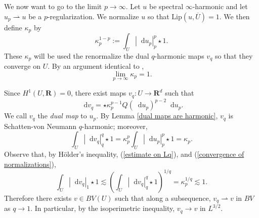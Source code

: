 \documentclass[reqno,11pt]{amsart}
\newcommand{\RR}{\mathbf{R}}
\newcommand*\dif{\mathop{}\!\mathrm{d}}
\newcommand{\Lip}{\mathrm{Lip}}
\newcommand{\dfn}[1]{\emph{#1}\index{#1}}
\newcommand{\weakto}{\rightharpoonup}
\theoremstyle{definition}
\numberwithin{equation}{section}
\begin{document}
We now want to go to the limit $p \to \infty$.
Let $u$ be spectral $\infty$-harmonic and let $u_p \weakto u$ be a $p$-regularization.
We normalize $u$ so that $\Lip(u, \overline U) = 1$.
We then define $\kappa_p$ by 
\begin{equation}\label{normalization condition}
\kappa_p^{1 - p} := \int_U |\dif u_p|_{p}^p \star 1.
\end{equation}
These $\kappa_p$ will be used the renormalize the dual $q$-harmonic maps $v_q$ so that they converge on $U$.
By an argument identical to \cite[Lemma 6.1]{daskalopoulos2022analytic},
\begin{equation}\label{convergence of normalizations}
\lim_{p \to \infty} \kappa_p = 1.
\end{equation}

Since $H^1(U, \RR) = 0$, there exist maps $v_q: U \to \RR^d$ such that
\begin{equation}\label{normalized dual map}
\dif v_q = \star \kappa_p^{p - 1} Q(\dif u_p)^{p - 2} \dif u_p.
\end{equation}
We call $v_q$ the \dfn{dual map} to $u_p$.
By Lemma \ref{dual maps are harmonic}, $v_q$ is Schatten-von Neumann $q$-harmonic; moreover,
\begin{equation}\label{estimate on Lq}
\int_U |\dif v_q|_{q}^q \star 1 = \kappa_p^p \int_U |\dif u_p|_{p}^p \star 1 = \kappa_p.
\end{equation}
Observe that, by H\"older's inequality, (\ref{estimate on Lq}), and (\ref{convergence of normalizations}),
$$\int_U |\dif v_q|_{1} \star 1 \lesssim \left(\int_U |\dif v_q|_{q}^q \star 1\right)^{1/q} = \kappa_p^{1/q} \lesssim 1.$$
Therefore there exists $v \in BV(U)$ such that along a subsequence, $v_q \weakto v$ in $BV$ as $q \to 1$.
In particular, by the isoperimetric inequality, $v_q \to v$ in $L^{3/2}$.
\end{document}
